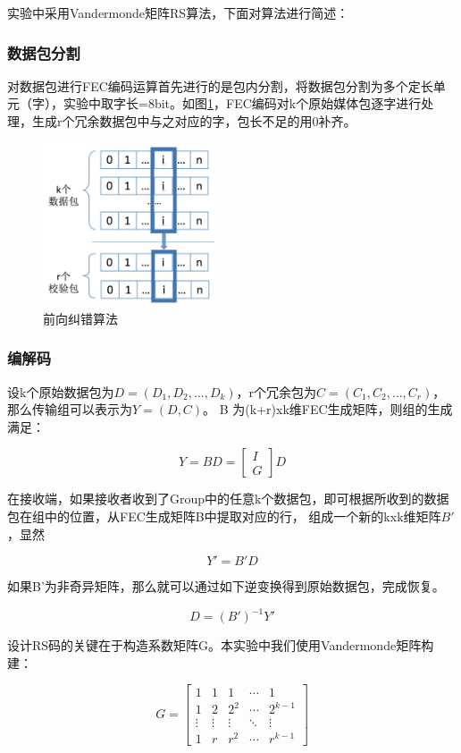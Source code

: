 \documentclass[onecolumn]{article}
\begin{document}
\begin{CJK*}{UTF8}{gbsn}
		实验中采用Vandermonde矩阵RS算法，下面对算法进行简述：
		
		\subsubsection{数据包分割}
		
		对数据包进行FEC编码运算首先进行的是包内分割，将数据包分割为多个定长单元（字），实验中取字长=8bit。如图\ref{fig:FEC}，FEC编码对k个原始媒体包逐字进行处理，生成r个冗余数据包中与之对应的字，包长不足的用0补齐。
		
		\begin{figure}[h]
			\centering
			\includegraphics[width=2in]{FEC.jpg}
			\caption{前向纠错算法}
			\label{fig:FEC}
		\end{figure}
		
		\subsubsection{编解码}
		
		设k个原始数据包为$D= (D_1,D_2,\dots,D_k)$，r个冗余包为$C=(C_1,C_2,\dots,C_r)$，那么传输组可以表示为$Y= (D,C)$。
		B 为(k+r)xk维FEC生成矩阵，则组的生成满足：
		
		$$Y=BD=\left[ \begin{array}{c}I\\G\end{array} \right ]D$$
		
		在接收端，如果接收者收到了Group中的任意k个数据包，即可根据所收到的数据包在组中的位置，从FEC生成矩阵B中提取对应的行， 组成一个新的kxk维矩阵$B'$，显然
		
		$$Y'=B'D$$
		
		如果B’为非奇异矩阵，那么就可以通过如下逆变换得到原始数据包，完成恢复。
		
		$$D=(B')^{-1}Y'$$
		
		设计RS码的关键在于构造系数矩阵G。本实验中我们使用Vandermonde矩阵构建：
		
		$$G=
		\left[ \begin{array}{ccccc}
		1      & 1      & 1      & \cdots & 1       \\
		1      & 2      & 2^2    & \cdots & 2^{k-1} \\
		\vdots & \vdots & \vdots & \ddots & \vdots  \\
		1      & r      & r^2    & \cdots & r^{k-1}
		\end{array} 
		\right ]$$
		

\end{CJK*}
\end{document}
